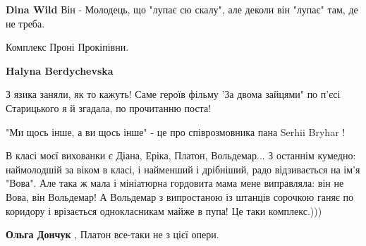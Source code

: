 \begin{itemize}
\begin{itemize}
\textbf{Dina Wild} Він - Молодець, що "лупає сю скалу", але деколи він "лупає" там, де не треба.
\end{itemize}

 
Комплекс Проні Прокіпівни.

\begin{itemize}
 
\textbf{Halyna Berdychevska} 

З язика заняли, як то кажуть! Саме героїв фільму 'За двома зайцями" по п'єсі
Старицького я й згадала, по прочитанню поста!

"Ми щось інше, а ви щось інше" - це про співрозмовника пана Serhii Bryhar !

 

В класі моєї вихованки є Діана, Еріка, Платон, Вольдемар... З останнім кумедно:
наймолодшій за віком в класі, і найменший і дрібніший, радо відзивається на
ім'я "Вова". Але така ж мала і мініатюрна гордовита мама мене виправляла: він
не Вова, він Вольдемар! А Вольдемар з випростаною із штанців сорочкою ганяє по
коридору і врізається однокласникам майже в пупа! Це таки комплекс.)))


 
\textbf{Ольга Дончук} , Платон все-таки не з цієї опери.

 

\end{itemize}
\end{itemize}
